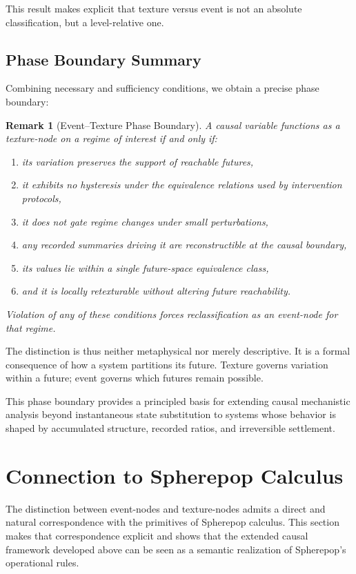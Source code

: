 \documentclass[11pt]{article}
\newtheorem{remark}{Remark}
\begin{document}
This result makes explicit that texture versus event is not an absolute
classification, but a level-relative one.

\subsection{Phase Boundary Summary}

Combining necessary and sufficiency conditions, we obtain a precise phase
boundary:

\begin{remark}[Event--Texture Phase Boundary]
A causal variable functions as a texture-node on a regime of interest if and
only if:
\begin{enumerate}
\item its variation preserves the support of reachable futures,
\item it exhibits no hysteresis under the equivalence relations used by
intervention protocols,
\item it does not gate regime changes under small perturbations,
\item any recorded summaries driving it are reconstructible at the causal
boundary,
\item its values lie within a single future-space equivalence class,
\item and it is locally retexturable without altering future reachability.
\end{enumerate}
Violation of any of these conditions forces reclassification as an event-node
for that regime.
\end{remark}

The distinction is thus neither metaphysical nor merely descriptive. It is a
formal consequence of how a system partitions its future. Texture governs
variation within a future; event governs which futures remain possible.

This phase boundary provides a principled basis for extending causal
mechanistic analysis beyond instantaneous state substitution to systems whose
behavior is shaped by accumulated structure, recorded ratios, and irreversible
settlement.

\section{Connection to Spherepop Calculus}

The distinction between event-nodes and texture-nodes admits a direct and
natural correspondence with the primitives of Spherepop calculus. This section
makes that correspondence explicit and shows that the extended causal framework
developed above can be seen as a semantic realization of Spherepop’s operational
rules.
\end{document}
